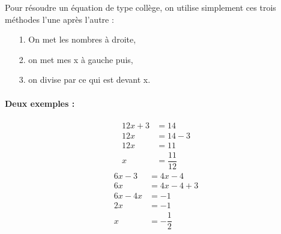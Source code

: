 \documentclass[11pt]{article}
\begin{document}
Pour résoudre un équation de type collège, on utilise simplement ces trois méthodes l’une après l’autre :

\begin{center}
    \begin{enumerate}
        \item[1.] On met les nombres à droite, 
        \item[2.] on met mes x à gauche puis,  
        \item[3.] on divise par ce qui est devant x.
    \end{enumerate}
\end{center}

\paragraph{Deux exemples : } 
\begin{multicols}{2}
    \begin{align*}
        12x + 3 &= 14 \\
        12x &= 14 - 3 \\
        12x &= 11 \\
        x &= \dfrac{11}{12}
    \end{align*}
    \columnbreak
    \begin{align*}
        6x - 3 &= 4x - 4 \\
        6x &= 4x - 4 + 3 \\
        6x - 4x &= - 1 \\
        2x &= -1 \\
        x &= -\dfrac{1}{2}
    \end{align*}
\end{multicols}

\newpage
\end{document}
